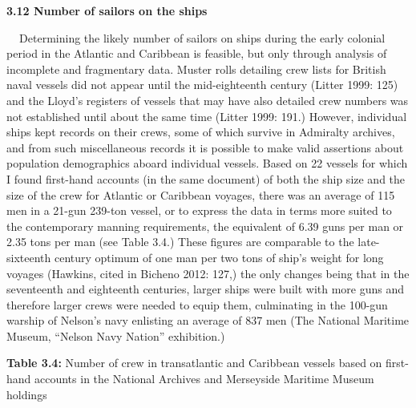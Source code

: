 \begin{styleStandard}
\textbf{3.12 Number of sailors on the ships}
\end{styleStandard}

\begin{styleStandard}
\textbf{\ \ }Determining the likely number of sailors on ships during the early colonial period in the Atlantic and Caribbean is feasible, but only through analysis of incomplete and fragmentary data. Muster rolls detailing crew lists for British naval vessels did not appear until the mid-eighteenth century (Litter 1999: 125) and the Lloyd’s registers of vessels that may have also detailed crew numbers was not established until about the same time (Litter 1999: 191.) However, individual ships kept records on their crews, some of which survive in Admiralty archives, and from such miscellaneous records it is possible to make valid assertions about population demographics aboard individual vessels. Based on 22 vessels for which I found first-hand accounts (in the same document) of both the ship size and the size of the crew for Atlantic or Caribbean voyages, there was an average of 115 men in a 21-gun 239-ton vessel, or to express the data in terms more suited to the contemporary manning requirements, the equivalent of 6.39 guns per man or 2.35 tons per man (see Table 3.4.) These figures are comparable to the late-sixteenth century optimum of one man per two tons of ship’s weight for long voyages (Hawkins, cited in Bicheno 2012: 127,) the only changes being that in the seventeenth and eighteenth centuries, larger ships were built with more guns and therefore larger crews were needed to equip them, culminating in the 100-gun warship of Nelson’s navy enlisting an average of 837 men (The National Maritime Museum, “Nelson Navy Nation” exhibition.)
\end{styleStandard}

\clearpage\begin{styleStandard}
\textbf{Table 3.4:} Number of crew in transatlantic and Caribbean vessels based on first-hand accounts in the National Archives and Merseyside Maritime Museum holdings
\end{styleStandard}

